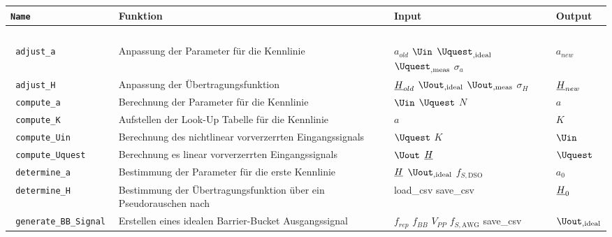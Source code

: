 \documentclass[../Report.tex]{subfiles}
\begin{document}
\begin{table}[H]
\centering 
\begin{tabular}[t]{| >{\texttt\bgroup}m{3.5cm}<{\egroup}|m{8cm}|m{2cm}|m{2cm}|} 
  \hline
    \textrm{\textbf{Name}} & \textbf{Funktion} & \textbf{Input} & \textbf{Output} \\ 
  \hline \hline
    \multicolumn{4}{|c|}{blocks} \\
  \hline \hline
  adjust\_a & Anpassung der Parameter für die Kennlinie & $a_{old}$ \newline $\Uin$ \newline $\Uquest_{,\textrm{ideal}}$ \newline $\Uquest_{,\textrm{meas}}$ \newline $\sigma_a$ & $a_{new}$\\
  \hline
  adjust\_H & Anpassung der Übertragungsfunktion & $\underline{H}_{old}$ \newline $\Uout_{,\textrm{ideal}}$ \newline $\Uout_{,\textrm{meas}}$ \newline $\sigma_H$ & $\underline{H}_{new}$\\
  \hline
  compute\_a & Berechnung der Parameter für die Kennlinie & $\Uin$ \newline $\Uquest$ \newline $N$ & $a$\\
  \hline
  compute\_K & Aufstellen der Look-Up Tabelle für die Kennlinie & $a$ & $K$\\
  \hline
  compute\_Uin & Berechnung des nichtlinear vorverzerrten Eingangssignals & $\Uquest$ \newline $K$ & $\Uin$\\
  \hline
  compute\_Uquest & Berechnung es linear vorverzerrten Eingangssignals & $\Uout$ \newline $\underline{H}$ & $\Uquest$\\
  \hline
  determine\_a & Bestimmung der Parameter für die erste Kennlinie & $\underline{H}$ \newline $\Uout_{,\textrm{ideal}}$ \newline $f_{S,\textrm{DSO}}$ & $a_0$\\
  \hline
  determine\_H & Bestimmung der Übertragungsfunktion über ein Pseudorauschen nach \cite{PJS_Denys} & load\_csv \newline save\_csv  & $\underline{H}_0$\\
  \hline
  generate\_BB\_Signal & Erstellen eines idealen Barrier-Bucket Ausgangssignal & $f_{rep}$ \newline $f_{BB}$ \newline $V_{PP}$ \newline $f_{S,\textrm{AWG}}$ \newline save\_csv & $\Uout_{,\textrm{ideal}}$\\

\end{tabular}
\end{table}
\end{document}

